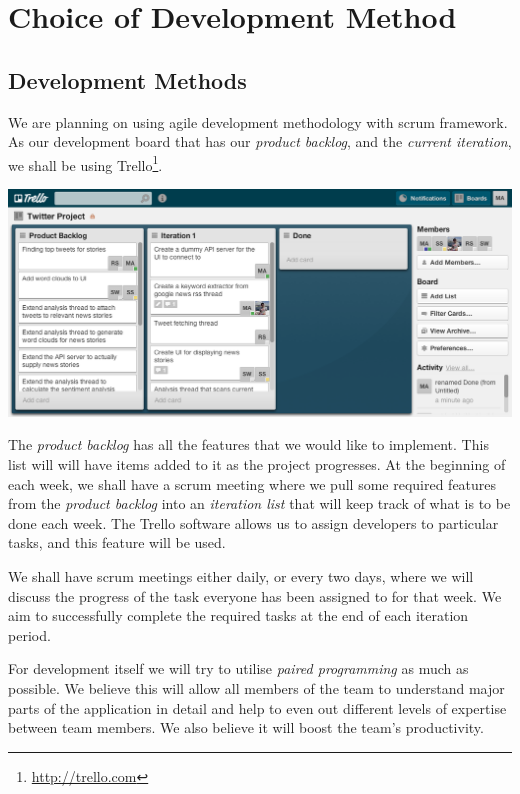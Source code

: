 \documentclass[a4paper,11pt]{article}
\begin{document}
	\section{Choice of Development Method}
		\subsection{Development Methods}
		
			We are planning on using agile development methodology with scrum framework. As our development board that has our \emph{product backlog}, and the \emph{current iteration}, we shall be using Trello\footnote{\url{http://trello.com}}.
			\begin{center}
			\includegraphics[scale=0.4]{trello.png}
		  \end{center}
	
			The \emph{product backlog} has all the features that we would like to implement. This list will will have items added to it as the project progresses. At the beginning of each week, we shall have a scrum meeting where we pull some required features from the \emph{product backlog} into an \emph{iteration list} that will keep track of what is to be done each week. The Trello software allows us to assign developers to particular tasks, and this feature will be used.
			
			We shall have scrum meetings either daily, or every two days, where we will discuss the progress of the task everyone has been assigned to for that week. We aim to successfully complete the required tasks at the end of each iteration period.
			
			For development itself we will try to utilise \emph{paired programming} as much as possible. We believe this will allow all members of the team to understand major parts of the application in detail and help to even out different levels of expertise between team members. We also believe it will boost the team's productivity.
	
\end{document}
